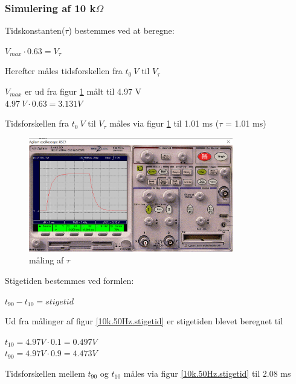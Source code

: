 \subsubsection{Simulering af 10 k$\Omega$ }
Tidskonstanten($\tau$) bestemmes ved at beregne:

\begin{center}
$V_{max} \cdot 0.63 = V_{\tau}$
\end{center}

Herefter måles tidsforskellen fra $t_0 \  V$ til $V_{\tau}$

$V_{max}$ er ud fra figur \ref{10k.50Hz.tau} målt til 4.97 V
\\ 
$4.97 \ V \cdot 0.63 = 3.131 V$

Tidsforskellen fra $t_0 \ V$ til $V_{\tau}$ måles via figur \ref{10k.50Hz.tau} til 1.01 ms ($\tau$ = 1.01 ms)

\begin{figure}[h]
 \begin{center}
  \includegraphics[height=5cm]{P_Fig/figur3_10k_50Hz_tau.png}
  \caption{måling af $\tau$}
  \label{10k.50Hz.tau}
 \end{center}
\end{figure}

\newpage

Stigetiden bestemmes ved formlen:
\begin{center}
$t_{90} - t_{10} = stigetid$
\end{center}

Ud fra målinger af figur \ref{10k.50Hz.stigetid}
er stigetiden blevet beregnet til

\begin{center}
$t_{10} = 4.97 V \cdot 0.1 = 0.497 V$
\\
$t_{90} = 4.97 V \cdot 0.9 = 4.473 V$
\end{center}

Tidsforskellen mellem $t_{90}$ og $t_{10}$ måles via figur \ref{10k.50Hz.stigetid} til 2.08 ms

